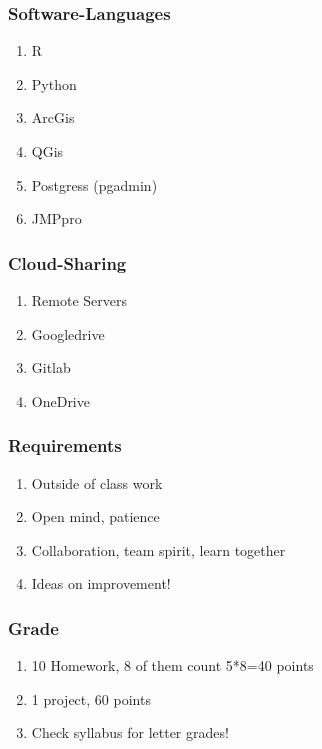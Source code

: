 \documentclass{beamer}
\begin{document}
\begin{frame}
\frametitle{Software-Languages}

\begin{enumerate}
\item R
\item Python
\item ArcGis
\item QGis
\item Postgress (pgadmin)
\item JMPpro
 \end{enumerate}
\end{frame}

\begin{frame}
\frametitle{Cloud-Sharing}
\begin{enumerate}
\item Remote Servers
\item Googledrive
\item Gitlab
\item OneDrive
\end{enumerate}
\end{frame}

\begin{frame}
\frametitle{Requirements}

\begin{enumerate}
\item<2-> Outside of class work 
\item<3-> Open mind, patience 
\item<4-> Collaboration, team spirit, learn together
\item<5-> Ideas on improvement!
\end{enumerate}
\end{frame}
 
\begin{frame}
\frametitle{Grade}

\begin{enumerate}
\item<2-> 10 Homework, 8 of them count 5*8=40 points
\item<3-> 1 project, 60 points
\item<4-> Check syllabus for letter grades!
\end{enumerate}
\end{frame} 
 
 
\end{document}
